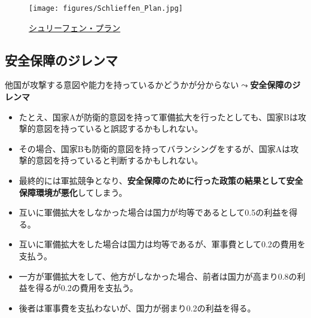 \documentclass[
  xelatex,
  ja=standard]{bxjsarticle}
\providecommand{\tightlist}{%
  \setlength{\itemsep}{0pt}\setlength{\parskip}{0pt}}\usepackage{longtable,booktabs,array}
\begin{document}
\begin{figure}[htpb]

{\centering \texttt{[image: figures/Schlieffen\_Plan.jpg]}

}

\caption{\href{https://commons.wikimedia.org/wiki/File:Schlieffen_Plan.jpg}{シュリーフェン・プラン}}

\end{figure}

\hypertarget{ux5b89ux5168ux4fddux969cux306eux30b8ux30ecux30f3ux30de}{%
\subsection{安全保障のジレンマ}\label{ux5b89ux5168ux4fddux969cux306eux30b8ux30ecux30f3ux30de}}

他国が攻撃する意図や能力を持っているかどうかが分からない\(\leadsto\)\textbf{安全保障のジレンマ}\citep{jervis1978}

\begin{itemize}
\tightlist
\item
  たとえ、国家Aが防衛的意図を持って軍備拡大を行ったとしても、国家Bは攻撃的意図を持っていると誤認するかもしれない。
\item
  その場合、国家Bも防衛的意図を持ってバランシングをするが、国家Aは攻撃的意図を持っていると判断するかもしれない。
\item
  最終的には軍拡競争となり、\textbf{安全保障のために行った政策の結果として安全保障環境が悪化}してしまう。
\end{itemize}

\begin{tcolorbox}[enhanced jigsaw, colback=white, leftrule=.75mm, bottomrule=.15mm, opacityback=0, opacitybacktitle=0.6, toptitle=1mm, bottomtitle=1mm, toprule=.15mm, coltitle=black, title=\textcolor{quarto-callout-tip-color}{\faLightbulb}\hspace{0.5em}{安全保障のジレンマ}, titlerule=0mm, colbacktitle=quarto-callout-tip-color!10!white, breakable, arc=.35mm, colframe=quarto-callout-tip-color-frame, rightrule=.15mm, left=2mm]

\begin{itemize}
\tightlist
\item
  互いに軍備拡大をしなかった場合は国力が均等であるとして0.5の利益を得る。
\item
  互いに軍備拡大をした場合は国力は均等であるが、軍事費として0.2の費用を支払う。
\item
  一方が軍備拡大をして、他方がしなかった場合、前者は国力が高まり0.8の利益を得るが0.2の費用を支払う。
\item
  後者は軍事費を支払わないが、国力が弱まり0.2の利益を得る。
\end{itemize}

\end{tcolorbox}
\end{document}

